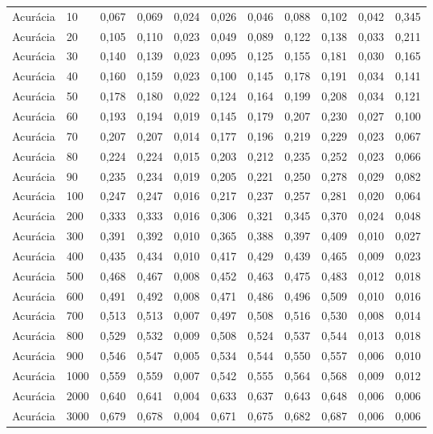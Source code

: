 \begin{longtable}{@{}llrrrrrrrrr@{}}
Acurácia & 10 & 0,067 & 0,069 & 0,024 & 0,026 & 0,046 & 0,088 & 0,102 & 0,042 & 0,345 \\
Acurácia & 20 & 0,105 & 0,110 & 0,023 & 0,049 & 0,089 & 0,122 & 0,138 & 0,033 & 0,211 \\
Acurácia & 30 & 0,140 & 0,139 & 0,023 & 0,095 & 0,125 & 0,155 & 0,181 & 0,030 & 0,165 \\
Acurácia & 40 & 0,160 & 0,159 & 0,023 & 0,100 & 0,145 & 0,178 & 0,191 & 0,034 & 0,141 \\
Acurácia & 50 & 0,178 & 0,180 & 0,022 & 0,124 & 0,164 & 0,199 & 0,208 & 0,034 & 0,121 \\
Acurácia & 60 & 0,193 & 0,194 & 0,019 & 0,145 & 0,179 & 0,207 & 0,230 & 0,027 & 0,100 \\
Acurácia & 70 & 0,207 & 0,207 & 0,014 & 0,177 & 0,196 & 0,219 & 0,229 & 0,023 & 0,067 \\
Acurácia & 80 & 0,224 & 0,224 & 0,015 & 0,203 & 0,212 & 0,235 & 0,252 & 0,023 & 0,066 \\
Acurácia & 90 & 0,235 & 0,234 & 0,019 & 0,205 & 0,221 & 0,250 & 0,278 & 0,029 & 0,082 \\
Acurácia & 100 & 0,247 & 0,247 & 0,016 & 0,217 & 0,237 & 0,257 & 0,281 & 0,020 & 0,064 \\
Acurácia & 200 & 0,333 & 0,333 & 0,016 & 0,306 & 0,321 & 0,345 & 0,370 & 0,024 & 0,048 \\
Acurácia & 300 & 0,391 & 0,392 & 0,010 & 0,365 & 0,388 & 0,397 & 0,409 & 0,010 & 0,027 \\
Acurácia & 400 & 0,435 & 0,434 & 0,010 & 0,417 & 0,429 & 0,439 & 0,465 & 0,009 & 0,023 \\
Acurácia & 500 & 0,468 & 0,467 & 0,008 & 0,452 & 0,463 & 0,475 & 0,483 & 0,012 & 0,018 \\
Acurácia & 600 & 0,491 & 0,492 & 0,008 & 0,471 & 0,486 & 0,496 & 0,509 & 0,010 & 0,016 \\
Acurácia & 700 & 0,513 & 0,513 & 0,007 & 0,497 & 0,508 & 0,516 & 0,530 & 0,008 & 0,014 \\
Acurácia & 800 & 0,529 & 0,532 & 0,009 & 0,508 & 0,524 & 0,537 & 0,544 & 0,013 & 0,018 \\
Acurácia & 900 & 0,546 & 0,547 & 0,005 & 0,534 & 0,544 & 0,550 & 0,557 & 0,006 & 0,010 \\
Acurácia & 1000 & 0,559 & 0,559 & 0,007 & 0,542 & 0,555 & 0,564 & 0,568 & 0,009 & 0,012 \\
Acurácia & 2000 & 0,640 & 0,641 & 0,004 & 0,633 & 0,637 & 0,643 & 0,648 & 0,006 & 0,006 \\
Acurácia & 3000 & 0,679 & 0,678 & 0,004 & 0,671 & 0,675 & 0,682 & 0,687 & 0,006 & 0,006 \\

\end{longtable}
